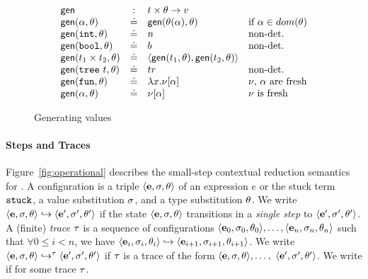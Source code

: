 \begin{figure}[t]
\[
\begin{array}{lcll}
\gensym       & :   & t \times \tsu \rightarrow v \\
\gen{\thole}{\tsu}  & \defeq  & \gen{\subst{\tsu}{\thole}}{\tsu} &  \text{if } \thole \in dom(\tsu) \\
\gen{\tint}{\tsu}   & \defeq  & n &  \text{non-det.} \\
\gen{\tbool}{\tsu}  & \defeq  & b &  \text{non-det.} \\
\gen{\tprod{t_1}{t_2}}{\tsu}  & \defeq  & \epair{\gen{t_1}{\tsu}}{\gen{t_2}{\tsu}} & \\ %
\gen{\ttree{t}}{\tsu}  & \defeq  & tr &  \text{non-det.} \\
\gen{\tfun}{\tsu}   & \defeq & \efun{x}{\vhole{\thole}} &  \text{\ehole, \thole are fresh} \\
\gen{\thole}{\tsu}  & \defeq & \vhole{\thole} & \text{\ehole is fresh} \\
\end{array}
\]
\caption{Generating values}
\label{fig:gen}
\end{figure}


\paragraph{Steps and Traces}

%
Figure~\ref{fig:operational} describes the small-step contextual
reduction semantics for \lang.
%
A configuration is a triple $\langle \mathbf{e}, \sigma, \theta \rangle$ of an
expression $e$ or the stuck term $\mathtt{stuck}$, a value substitution $\sigma$,
and a type substitution $\theta$.
%
%
We write $\langle \mathbf{e}, \sigma, \theta \rangle \hookrightarrow \langle \mathbf{e}', \sigma', \theta' \rangle$ if the state
$\langle \mathbf{e}, \sigma, \theta \rangle$ transitions in a \emph{single step} to
$\langle \mathbf{e}', \sigma', \theta' \rangle$.
%
A (finite) \emph{trace} $\tau$ is a sequence of configurations
$\langle \mathbf{e}_0, \sigma_0, \theta_0 \rangle, \ldots, \langle \mathbf{e}_n, \sigma_n, \theta_n \rangle$ such that
$\forall 0 \leq i < n$, we have
$\langle \mathbf{e}_i, \sigma_i, \theta_i \rangle \hookrightarrow \langle \mathbf{e}_{i+1}, \sigma_{i+1}, \theta_{i+1} \rangle$.
%
We write $\langle \mathbf{e}, \sigma, \theta \rangle \hookrightarrow^{\tau} \langle \mathbf{e}', \sigma', \theta' \rangle$ if $\tau$ is
a trace of the form $\langle \mathbf{e}, \sigma, \theta \rangle,\ldots,$ $\langle \mathbf{e}', \sigma', \theta' \rangle$.
%
We write  if
 for some trace $\tau$.

